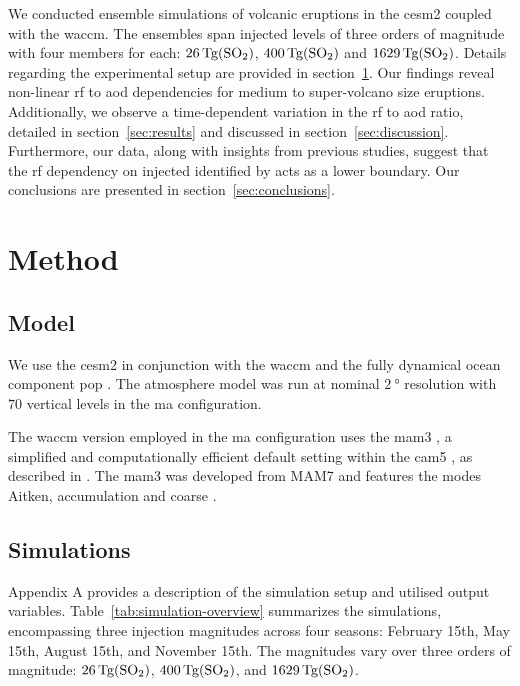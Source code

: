 \documentclass{ametsocV6.1}
\newcommand{\iso}[1][i]{{#1}njected \ce{SO2}}
\begin{document}
We conducted ensemble simulations of volcanic eruptions in the \gls{cesm2} coupled with
the \gls{waccm}. The ensembles span \iso{} levels of three orders of magnitude with four
members for each: \(\SI{26}{\tera\gram(\ce{SO2})}\), \(\SI{400}{\tera\gram(\ce{SO2})}\)
and \(\SI{1629}{\tera\gram(\ce{SO2})}\). Details regarding the experimental setup are
provided in section~\ref{sec:method}. Our findings reveal non-linear \gls{rf} to
\gls{aod} dependencies for medium to super-volcano size eruptions. Additionally, we
observe a time-dependent variation in the \gls{rf} to \gls{aod} ratio, detailed in
section~\ref{sec:results} and discussed in section~\ref{sec:discussion}. Furthermore,
our data, along with insights from previous studies, suggest that the \gls{rf}
dependency on \iso{} identified by \citet{niemeier2015} acts as a lower boundary. Our
conclusions are presented in section~\ref{sec:conclusions}.

\section{Method}\label{sec:method}

\subsection{Model}

We use the \gls{cesm2} \citep{danabasoglu2020} in conjunction with the \gls{waccm}
\citep{gettleman2019} and the fully dynamical ocean component \gls{pop}
\citep{smith2010, danabasoglu2020}. The atmosphere model was run at nominal
\(\SI{2}{\degree}\) resolution with \(70\) vertical levels in the \gls{ma}
configuration.

The \gls{waccm} version employed in the \gls{ma} configuration uses the \gls{mam3}
\citep{gettleman2019}, a simplified and computationally efficient default setting within
the \gls{cam5} \citep{liu2016}, as described in \citet{liu2012}. The \gls{mam3} was
developed from MAM7 and features the modes Aitken, accumulation and coarse
\citep{liu2016}.

\subsection{Simulations}

Appendix A provides a description of the simulation setup and utilised output variables.
Table~\ref{tab:simulation-overview} summarizes the simulations, encompassing three
 injection magnitudes across four seasons: February 15th, May 15th, August 15th,
and November 15th. The magnitudes vary over three orders of magnitude:
\(\SI{26}{\tera\gram(\ce{SO2})}\), \(\SI{400}{\tera\gram(\ce{SO2})}\), and
\(\SI{1629}{\tera\gram(\ce{SO2})}\).
\end{document}
